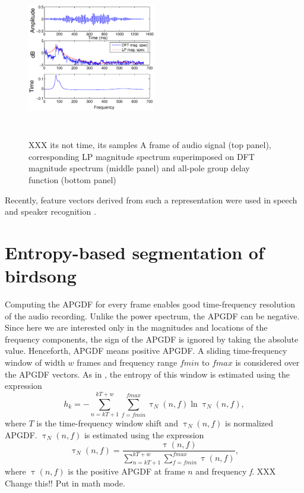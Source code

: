 \documentclass[a4paper]{article}
\begin{document}
\begin{figure}[h]

\includegraphics[width=0.5\textwidth,height=7cm]
{apgd.eps}
\caption{XXX its not time, its samples A frame of audio signal (top panel), corresponding LP
magnitude spectrum superimposed on DFT magnitude spectrum (middle panel) and
all-pole group delay function (bottom panel)  }
\label{fig:all-pole}
\end{figure}


Recently, feature vectors
derived from such a representation were used in speech \cite{drugman} and speaker
recognition \cite{padman}. 









\section{Entropy-based segmentation of birdsong}

Computing the APGDF for every frame enables good time-frequency resolution of
the audio recording. Unlike the power spectrum, the APGDF can be negative.
Since here we are interested only in the magnitudes and locations of the
frequency components, the sign of the APGDF is ignored by taking the absolute
value. Henceforth, APGDF means positive APGDF.  A sliding time-frequency window
of width $w$ frames and frequency range $fmin$ to $fmax$ is considered over the
APGDF vectors. As in \cite{wang2013}, the entropy of this window is estimated
using the expression
\begin{equation}
\label{eq:2}
h_{k}=-\sum_{n=kT+1}^{kT+w}\sum_{f=fmin}^{fmax} \uptau_N(n,f) \ln \uptau_N(n,f),
\end{equation}
where $T$ is the time-frequency window shift and $\uptau_N(n,f)$ is normalized
APGDF. $\uptau_N(n,f)$ is estimated using the expression 
\begin{equation}
\uptau_N(n,f)=\frac {\uptau(n,f)}
{\sum_{n=kT+1}^{kT+w}\sum_{f=fmin}^{fmax} \uptau(n,f)},
\end{equation}
where $\uptau(n,f)$ is the positive APGDF at frame $n$ and frequency
\textit{f}. XXX Change this!! Put in math mode.
\end{document}
